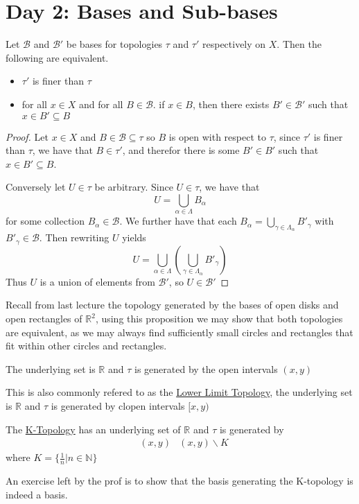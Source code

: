 \section{Day 2: Bases and Sub-bases}
\begin{proposition}
    Let $\mathscr{B}$ and $\mathscr{B}'$ be bases for topologies $\tau$ and $\tau'$ respectively on $X$. Then the following are equivalent.
    \begin{itemize}
        \item $\tau'$ is finer than $\tau$
        \item for all $x\in X$ and for all $B\in\mathscr{B}$. if $x\in B$, then there exists $B'\in\mathscr{B}'$ such that $x\in B'\subseteq B$
    \end{itemize}
\end{proposition}
\begin{proof}
    Let $x\in X$ and $B\in\mathscr{B}\subseteq\tau$ so $B$ is open with respect to $\tau$, since $\tau'$ is finer than $\tau$, we have that $B\in\tau'$, and therefor there is some $B'\in B'$ such that $x\in B'\subseteq B$. 

Conversely let $U\in\tau$ be arbitrary. Since $U\in\tau$, we have that 
\[U=\bigcup_{\alpha\in\Lambda}B_\alpha\]
for some collection $B_\alpha\in\mathscr{B}$. We further have that each $B_\alpha=\bigcup_{\gamma\in\Lambda_\alpha}B'_\gamma$ with $B'_\gamma\in\mathscr{B}$. Then rewriting $U$ yields
\[U=\bigcup_{\alpha\in\Lambda}\left(\bigcup_{\gamma\in\Lambda_\alpha}B'_\gamma\right)\]
Thus $U$ is a union of elements from $\mathscr{B}'$, so $U\in\mathscr{B}'$
\end{proof}
Recall from last lecture the topology generated by the bases of open disks and open rectangles of $\mathbb{R}^2$, using this proposition we may show that both topologies are equivalent, as we may always find sufficiently small circles and rectangles that fit within other circles and rectangles.

\begin{example}
    The underlying set is $\mathbb{R}$ and $\tau$ is generated by the open intervals $(x,y)$
\end{example}
\begin{example}
    This is also commonly refered to as the \href{https://en.wikipedia.org/wiki/Lower_limit_topology}{Lower Limit Topology}, the underlying set is $\mathbb{R}$ and $\tau$ is generated by clopen intervals $[x,y)$
\end{example}
\begin{example}[K-Topology]
    The \href{https://en.wikipedia.org/wiki/K-topology}{K-Topology} has an underlying set of $\mathbb{R}$ and $\tau$ is generated by
    \begin{align*}
        &(x,y) &(x,y)\backslash K
    \end{align*}
    where $K=\{\frac{1}{n}\vert n\in\mathbb{N}\}$
\end{example}
An exercise left by the prof is to show that the basis generating the K-topology is indeed a basis.
